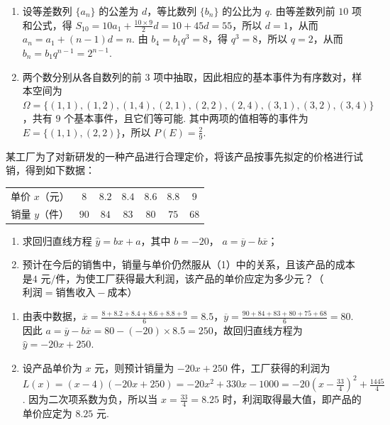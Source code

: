 \begin{solution}
\begin{enumerate}
\item 设等差数列 \(\{a_n\}\) 的公差为 \(d\)，等比数列 \(\{b_n\}\) 的公比为 \(q\). 由等差数列前 \(10\) 项和公式，得 \(S_{10}=10a_1+\frac{10\times9}{2}d=10+45d=55\)，所以 \(d=1\)，从而 \(a_n=a_1+(n-1)d=n\). 由 \(b_4=b_1q^3=8\)，得 \(q^3=8\)，所以 \(q=2\)，从而 \(b_n=b_1q^{n-1}=2^{n-1}\).
\item 两个数分别从各自数列的前 \(3\) 项中抽取，因此相应的基本事件为有序数对，样本空间为 \(\Omega=\{(1,1),(1,2),(1,4),(2,1),(2,2),(2,4),(3,1),(3,2),(3,4)\}\)，共有 \(9\) 个基本事件，且它们等可能. 其中两项的值相等的事件为 \(E=\{(1,1),(2,2)\}\)，所以 \(P(E)=\frac{2}{9}\).
\end{enumerate}
\end{solution}

\begin{problem}
某工厂为了对新研发的一种产品进行合理定价，将该产品按事先拟定的价格进行试销，得到如下数据：
\begin{center}
\begin{tabular}{ccccccc}
单价 \(x\)（\(\text{元}\)） & \(8\) & \(8.2\) & \(8.4\) & \(8.6\) & \(8.8\) & \(9\) \\
销量 \(y\)（\(\text{件}\)） & \(90\) & \(84\) & \(83\) & \(80\) & \(75\) & \(68\)
\end{tabular}
\end{center}
\begin{enumerate}
\item 求回归直线方程 \( \hat{y} = bx + a \)，其中 \(b = -20\)， \( a = \overline{y} - b\overline{x} \)；
\item 预计在今后的销售中，销量与单价仍然服从（1）中的关系，且该产品的成本是\(4\text{ 元/件}\)，为使工厂获得最大利润，该产品的单价应定为多少\(\text{元}\)？（\(\text{利润}=\text{销售收入}-\text{成本}\)）
\end{enumerate}
\end{problem}

\begin{solution}
\begin{enumerate}
\item 由表中数据，\(\overline{x}=\frac{8+8.2+8.4+8.6+8.8+9}{6}=8.5\)，\(\overline{y}=\frac{90+84+83+80+75+68}{6}=80\). 因此 \(a=\overline{y}-b\overline{x}=80-(-20)\times8.5=250\)，故回归直线方程为 \(\hat{y}=-20x+250\).
\item 设产品单价为 \(x\) 元，则预计销量为 \(-20x+250\) 件，工厂获得的利润为 \(L(x)=(x-4)(-20x+250)=-20x^2+330x-1000=-20\left(x-\frac{33}{4}\right)^2+\frac{1445}{4}\). 因为二次项系数为负，所以当 \(x=\frac{33}{4}=8.25\) 时，利润取得最大值，即产品的单价应定为 \(8.25\) 元.
\end{enumerate}
\end{solution}

